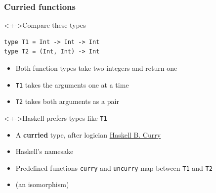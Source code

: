 \documentclass{beamer}
\begin{document}
\begin{frame}[fragile]
  \frametitle{Curried functions}

\begin{block}<+->{Compare these types}
\begin{verbatim}
type T1 = Int -> Int -> Int
type T2 = (Int, Int) -> Int
\end{verbatim}
\begin{itemize}
\item Both function types take two integers and return one
\item \texttt{T1} takes the arguments one at a time
\item \texttt{T2} takes both arguments as a pair
\end{itemize}
\end{block}
\begin{block}<+->{Haskell prefers types like \texttt{T1}}
  \begin{itemize}
  \item A \textbf{curried} type, after logician \href{https://en.wikipedia.org/wiki/Haskell_Curry}{Haskell B. Curry}
  \item Haskell's namesake
  \item Predefined functions \texttt{curry} and \texttt{uncurry} map between \texttt{T1} and \texttt{T2}
  \item (an isomorphism)
  \end{itemize}
\end{block}
\end{frame}
\end{document}

